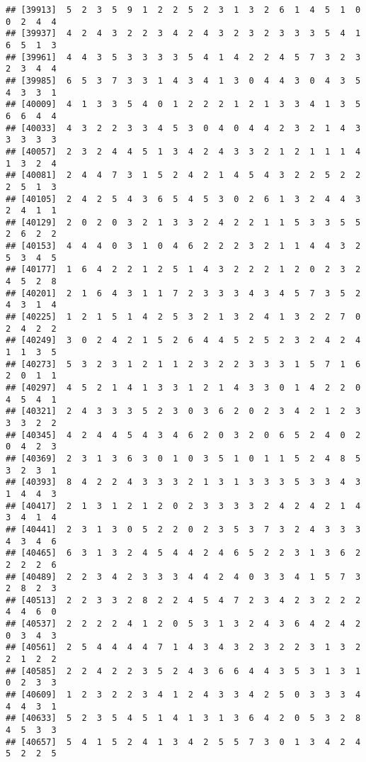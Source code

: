 \documentclass[
]{article}
\begin{document}
\begin{verbatim}
## [39913]  5  2  3  5  9  1  2  2  5  2  3  1  3  2  6  1  4  5  1  0  0  2  4  4
## [39937]  4  2  4  3  2  2  3  4  2  4  3  2  3  2  3  3  3  5  4  1  6  5  1  3
## [39961]  4  4  3  5  3  3  3  3  5  4  1  4  2  2  4  5  7  3  2  3  2  3  4  4
## [39985]  6  5  3  7  3  3  1  4  3  4  1  3  0  4  4  3  0  4  3  5  4  3  3  1
## [40009]  4  1  3  3  5  4  0  1  2  2  2  1  2  1  3  3  4  1  3  5  6  6  4  4
## [40033]  4  3  2  2  3  3  4  5  3  0  4  0  4  4  2  3  2  1  4  3  3  3  3  3
## [40057]  2  3  2  4  4  5  1  3  4  2  4  3  3  2  1  2  1  1  1  4  1  3  2  4
## [40081]  2  4  4  7  3  1  5  2  4  2  1  4  5  4  3  2  2  5  2  2  2  5  1  3
## [40105]  2  4  2  5  4  3  6  5  4  5  3  0  2  6  1  3  2  4  4  3  2  4  1  1
## [40129]  2  0  2  0  3  2  1  3  3  2  4  2  2  1  1  5  3  3  5  5  2  6  2  2
## [40153]  4  4  4  0  3  1  0  4  6  2  2  2  3  2  1  1  4  4  3  2  5  3  4  5
## [40177]  1  6  4  2  2  1  2  5  1  4  3  2  2  2  1  2  0  2  3  2  4  5  2  8
## [40201]  2  1  6  4  3  1  1  7  2  3  3  3  4  3  4  5  7  3  5  2  4  3  1  4
## [40225]  1  2  1  5  1  4  2  5  3  2  1  3  2  4  1  3  2  2  7  0  2  4  2  2
## [40249]  3  0  2  4  2  1  5  2  6  4  4  5  2  5  2  3  2  4  2  4  1  1  3  5
## [40273]  5  3  2  3  1  2  1  1  2  3  2  2  3  3  3  1  5  7  1  6  2  0  1  1
## [40297]  4  5  2  1  4  1  3  3  1  2  1  4  3  3  0  1  4  2  2  0  4  5  4  1
## [40321]  2  4  3  3  3  5  2  3  0  3  6  2  0  2  3  4  2  1  2  3  3  3  2  2
## [40345]  4  2  4  4  5  4  3  4  6  2  0  3  2  0  6  5  2  4  0  2  0  4  2  3
## [40369]  2  3  1  3  6  3  0  1  0  3  5  1  0  1  1  5  2  4  8  5  3  2  3  1
## [40393]  8  4  2  2  4  3  3  3  2  1  3  1  3  3  3  5  3  3  4  3  1  4  4  3
## [40417]  2  1  3  1  2  1  2  0  2  3  3  3  3  2  4  2  4  2  1  4  3  4  1  4
## [40441]  2  3  1  3  0  5  2  2  0  2  3  5  3  7  3  2  4  3  3  3  4  3  4  6
## [40465]  6  3  1  3  2  4  5  4  4  2  4  6  5  2  2  3  1  3  6  2  2  2  2  6
## [40489]  2  2  3  4  2  3  3  3  4  4  2  4  0  3  3  4  1  5  7  3  2  8  2  3
## [40513]  2  2  3  3  2  8  2  2  4  5  4  7  2  3  4  2  3  2  2  2  4  4  6  0
## [40537]  2  2  2  2  4  1  2  0  5  3  1  3  2  4  3  6  4  2  4  2  0  3  4  3
## [40561]  2  5  4  4  4  4  7  1  4  3  4  3  2  3  2  2  3  1  3  2  2  1  2  2
## [40585]  2  2  4  2  2  3  5  2  4  3  6  6  4  4  3  5  3  1  3  1  0  2  3  3
## [40609]  1  2  3  2  2  3  4  1  2  4  3  3  4  2  5  0  3  3  3  4  4  4  3  1
## [40633]  5  2  3  5  4  5  1  4  1  3  1  3  6  4  2  0  5  3  2  8  4  5  3  3
## [40657]  5  4  1  5  2  4  1  3  4  2  5  5  7  3  0  1  3  4  2  4  5  2  2  5

\end{verbatim}
\end{document}
